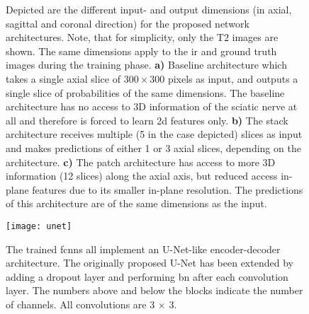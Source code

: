 \begin{figure}[htbp]
	\centering
	\hfill
    \hfill
	\caption[Inputs and Outputs of the Architectures]{Depicted are the different input- and output dimensions (in axial, sagittal and coronal direction) for the proposed network architectures. Note, that for simplicity, only the T2 images are shown. The same dimensions apply to the \gls{ir} and ground truth images during the training phase. \textbf{a)} Baseline architecture which takes a single axial slice of $300 \times 300$ pixels as input, and outputs a single slice of probabilities of the same dimensions. The baseline architecture has no access to 3D information of the sciatic nerve at all and therefore is forced to learn \gls{2d} features only. \textbf{b)} The stack architecture receives multiple (5 in the case depicted) slices as input and makes predictions of either 1 or 3 axial slices, depending on the architecture. \textbf{c)} The patch architecture has access to more 3D information (12 slices) along the axial axis, but reduced access in-plane features due to its smaller in-plane resolution. The predictions of this architecture are of the same dimensions as the input.}
	\label{fig:inout}  
\end{figure}

\begin{figure}[htbp]	
	\texttt{[image: unet]}
    \caption[Network Architecture]{The trained \gls{fcnn}s all implement an U-Net-like encoder-decoder architecture. The originally proposed U-Net has been extended by adding a dropout layer and performing \gls{bn} after each convolution layer. The numbers above and below the blocks indicate the number of channels. All convolutions are 3 $\times$ 3.}
    \label{fig:unet}
\end{figure}

